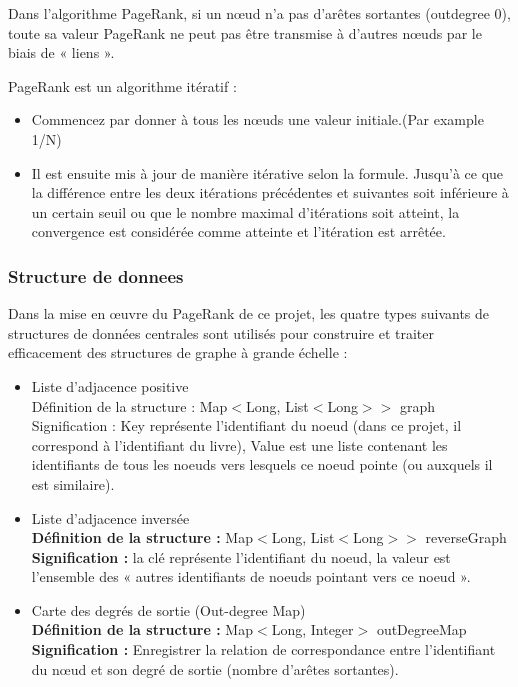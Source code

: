 \documentclass[11pt,english]{article}
\begin{document}
{    \indent Dans l'algorithme PageRank, si un nœud n'a pas d'arêtes sortantes (outdegree 0), toute sa valeur PageRank ne peut pas être transmise à d'autres nœuds par le biais de « liens ».

    \indent PageRank est un algorithme itératif :

    \begin{itemize}
        \item Commencez par donner à tous les nœuds une valeur initiale.(Par example 1/N)
        \item Il est ensuite mis à jour de manière itérative selon la formule. Jusqu'à ce que la différence entre les deux itérations précédentes et suivantes soit inférieure à un certain seuil ou que le nombre maximal d'itérations soit atteint, la convergence est considérée comme atteinte et l'itération est arrêtée.
    \end{itemize}

    \subsubsection{Structure de donnees}

    \indent 
    
    Dans la mise en œuvre du PageRank de ce projet, les quatre types suivants de structures de données centrales sont utilisés pour construire et traiter efficacement des structures de graphe à grande échelle :

    \begin{itemize}
        \item Liste d'adjacence positive
        \\Définition de la structure : Map$<$Long, List$<$Long$>$$>$ graph
        \\Signification : Key représente l'identifiant du noeud (dans ce projet, il correspond à l'identifiant du livre), Value est une liste contenant les identifiants de tous les noeuds vers lesquels ce noeud pointe (ou auxquels il est similaire).

        \item Liste d'adjacence inversée
        \\\textbf{Définition de la structure :} Map$<$Long, List$<$Long$>>$ reverseGraph
        \\\textbf{Signification :} la clé représente l'identifiant du noeud, la valeur est l'ensemble des « autres identifiants de noeuds pointant vers ce noeud ».

        \item Carte des degrés de sortie (Out-degree Map)
        \\\textbf{Définition de la structure :}  Map$<$Long, Integer$>$ outDegreeMap
        \\\textbf{Signification :} Enregistrer la relation de correspondance entre l'identifiant du nœud et son degré de sortie (nombre d'arêtes sortantes).


\end{itemize}}
\end{document}
